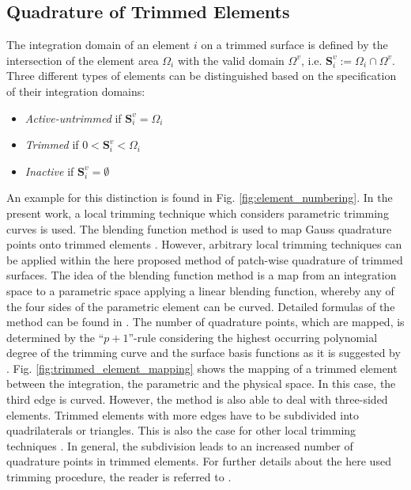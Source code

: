 \documentclass[3p]{elsarticle}
\begin{document}
\subsection{Quadrature of Trimmed Elements}\label{sec:integration_trimmed}
The integration domain of an element $i$ on a trimmed surface is defined by the intersection of the element area $\Omega_i$ with the valid domain $\Omega^v$, i.e. $\mathbf{S}_i^v := \Omega_i \cap \Omega^v$. Three different types of elements can be distinguished based on the specification of their integration domains:
\begin{itemize}
	\item \textit{Active-untrimmed} if $\mathbf{S}_i^v = \Omega_i$
	\item \textit{Trimmed} if $0 < \mathbf{S}_i^v < \Omega_i$
	\item \textit{Inactive} if $\mathbf{S}_i^v = \emptyset$
\end{itemize}
An example for this distinction is found in Fig. \ref{fig:element_numbering}. In the present work, a local trimming technique which considers parametric trimming curves is used. The blending function method is used to map Gauss quadrature points onto trimmed elements \cite{Guo2018}. However, arbitrary local trimming techniques can be applied within the here proposed method of patch-wise quadrature of trimmed surfaces. The idea of the blending function method is a map from an integration space to a parametric space applying a linear blending function, whereby any of the four sides of the parametric element can be curved. Detailed formulas of the method can be found in \cite{Szabo1991}. The number of quadrature points, which are mapped, is determined by the ``$p+1$''-rule considering the highest occurring polynomial degree of the trimming curve and the surface basis functions as it is suggested by \cite{Breitenberger2016}. Fig. \ref{fig:trimmed_element_mapping} shows the mapping of a trimmed element between the integration, the parametric and the physical space. In this case, the third edge is curved. However, the method is also able to deal with three-sided elements. Trimmed elements with more edges have to be subdivided into quadrilaterals or triangles. This is also the case for other local trimming techniques \cite{Breitenberger2016,Marussig2018,Kim2009,Kim2010,Guo2018}. In general, the subdivision leads to an increased number of quadrature points in trimmed elements. For further details about the here used trimming procedure, the reader is referred to \cite{Kim2009,Kim2010}.
\end{document}
